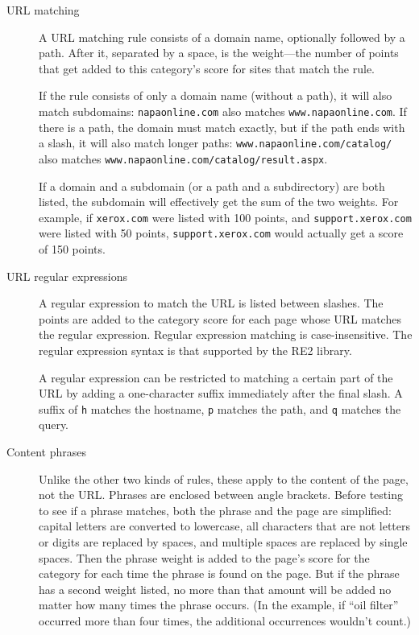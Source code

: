 \documentclass{article}
\begin{document}
\begin{description}

\item[URL matching] A URL matching rule consists of a domain name, optionally followed by a path. 
After it, separated by a space, is the weight---the number of points that get added to this category's score 
for sites that match the rule. 

If the rule consists of only a domain name (without a path),
it will also match subdomains: \verb"napaonline.com" also matches \verb"www.napaonline.com".
If there is a path, the domain must match exactly, but if the path ends with a slash,
it will also match longer paths: \verb"www.napaonline.com/catalog/" also matches 
\verb"www.napaonline.com/catalog/result.aspx".

If a domain and a subdomain (or a path and a subdirectory) 
are both listed, the subdomain will effectively get the sum of the two weights. For example, if \verb"xerox.com"
were listed with 100 points, and \verb"support.xerox.com" were listed with 50 points, \verb"support.xerox.com" 
would actually get a score of 150 points.

\item[URL regular expressions] A regular expression to match the URL is listed between slashes. 
The points are added to the category score for each page whose URL matches the regular expression. 
Regular expression matching is case-insensitive. The regular expression syntax is that supported by the RE2 library.

A regular expression can be restricted to matching a certain part of the URL by adding a one-character suffix
immediately after the final slash. A suffix of \verb"h" matches the hostname, \verb"p" matches the path,
and \verb"q" matches the query.

\item[Content phrases] Unlike the other two kinds of rules, these apply to the content of the page, not the URL. 
Phrases are enclosed between angle brackets. Before testing to see if a phrase matches, 
both the phrase and the page are simplified: capital letters are converted to lowercase, 
all characters that are not letters or digits are replaced by spaces,
and multiple spaces are replaced by single spaces. Then the phrase weight is added to the page's score for the category 
for each time the phrase is found on the page. But if the phrase has a second weight listed, 
no more than that amount will be added no matter how many times the phrase occurs. 
(In the example, if ``oil filter'' occurred more than four times, the additional occurrences wouldn't count.)

\end{description}
\end{document}
